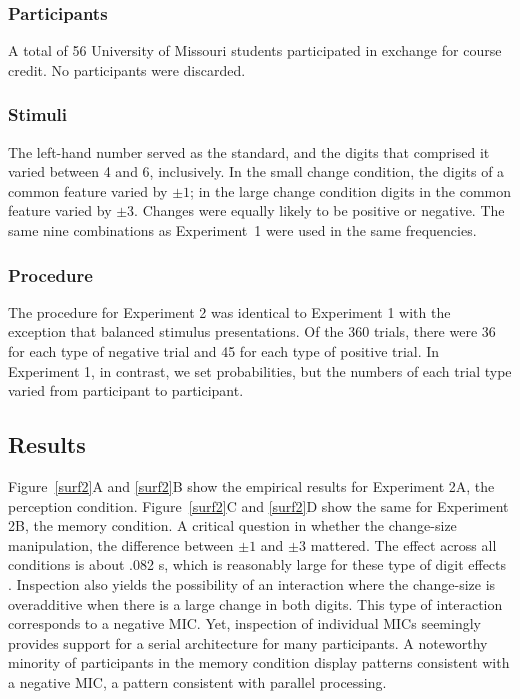 \documentclass[fignum,nobf,man]{apa}
\begin{document}
\subsubsection{Participants}  A total of 56 University of Missouri students participated in exchange for course credit.  No participants were discarded.


\subsubsection{Stimuli}  The left-hand number served as the standard, and the digits that comprised it varied between 4 and 6, inclusively.  In the small change condition, the digits of a common feature varied by $\pm1$; in the large change condition digits in the common feature varied by $\pm3$.  Changes were equally likely to be positive or negative.  The same nine combinations as Experiment~1 were used in the same frequencies.

\subsubsection{Procedure}
The procedure for Experiment 2 was identical to Experiment 1 with the exception that balanced stimulus presentations.  Of the 360 trials, there were 36 for each type of negative trial and 45 for each type of positive trial.  In Experiment 1, in contrast, we set probabilities, but the numbers of each trial type varied from participant to participant.

\subsection{Results}
Figure~\ref{surf2}A and \ref{surf2}B show the empirical results for Experiment 2A, the perception condition.  Figure~\ref{surf2}C and \ref{surf2}D show the same for Experiment 2B, the memory condition.  A critical question in whether the change-size manipulation, the difference between $\pm1$ and $\pm3$ mattered.  The effect across all conditions is about .082 s, which is reasonably large for these type of digit effects \citep{Moyer:Landauer:1967,Rouder:etal:2005a}.   Inspection also yields the possibility of an interaction where the change-size is overadditive when there is a large change in both digits.  This type of interaction corresponds to a negative MIC.   Yet, inspection of individual MICs seemingly provides support for a serial architecture for many participants.   A noteworthy minority of participants in the memory condition display patterns consistent with a negative MIC, a pattern consistent with parallel processing.
\end{document}
